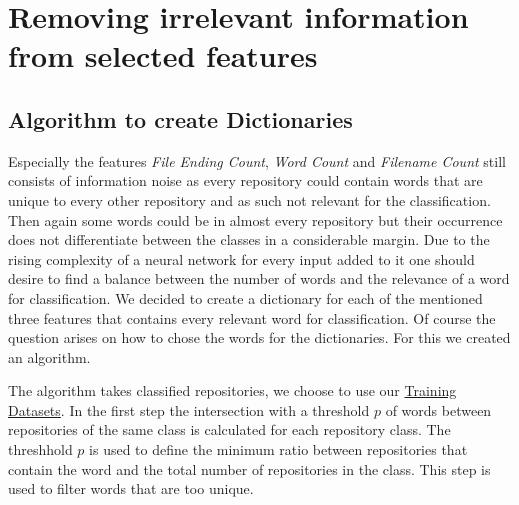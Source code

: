 \documentclass[paper=A4,pagesize=auto,12pt,headinclude=true,footinclude=true,BCOR=0mm,DIV=calc]{scrartcl}
\begin{document}
	
	
	\section{Removing irrelevant information from selected features}
	\label{sec: dictionary}
	\subsection{Algorithm to create Dictionaries}
	Especially the features \textit{File Ending Count}, \textit{Word Count} and\textit{ Filename Count} still consists of information noise as every repository could contain words that are unique to every other repository and as such not relevant for the classification. Then again some words could be in almost every repository but their occurrence does not differentiate between the classes in a considerable margin. Due to the rising complexity of a neural network for every input added to it one should desire to find a balance between the number of words and the relevance of a word for classification. We decided to create a dictionary for each of the mentioned three features that contains every relevant word for classification.
	Of course the question arises on how to chose the words for the dictionaries. For this we created an algorithm.
		
	The algorithm takes classified repositories, we choose to use our \hyperref[sec:Training Set]{Training Datasets}.
	In the first step the intersection with a threshold $p$ of words between repositories of the same class is calculated for each repository class. The threshhold $p$ is used to define the minimum ratio between repositories that contain the word and the total number of repositories in the class. 
	This step is used to filter words that are too unique.
	
\end{document}
